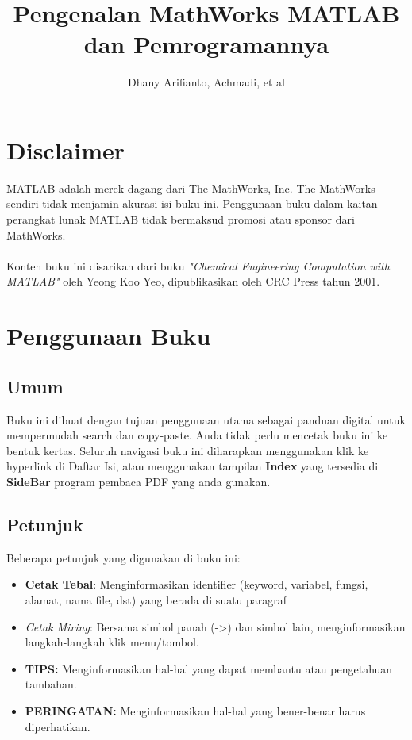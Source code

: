 \documentclass[12pt]{book}
\title{\LARGE \bf
	Pengenalan MathWorks MATLAB dan Pemrogramannya\\
}
\author{Dhany Arifianto, Achmadi, et al}
\date{}
\begin{document}
	\frontmatter
	\maketitle
	
	
	\newpage
	\tableofcontents
	
	
	\newpage
	\chapter{Disclaimer}
	
	MATLAB adalah merek dagang dari The MathWorks, Inc.
	The MathWorks sendiri tidak menjamin akurasi isi buku ini.
	Penggunaan buku dalam kaitan perangkat lunak MATLAB tidak bermaksud promosi atau sponsor dari MathWorks.
	\\
	\\
	Konten buku ini disarikan dari buku \textit{"Chemical Engineering Computation with MATLAB"} oleh Yeong Koo Yeo,
	dipublikasikan oleh CRC Press tahun 2001.
	
	
	\newpage
	\chapter{Penggunaan Buku}
	
	\section{Umum}
	Buku ini dibuat dengan tujuan penggunaan utama sebagai panduan digital untuk mempermudah search dan copy-paste.
	Anda tidak perlu mencetak buku ini ke bentuk kertas.
	Seluruh navigasi buku ini diharapkan menggunakan klik ke hyperlink di Daftar Isi,
	atau menggunakan tampilan \textbf{Index} yang tersedia di \textbf{SideBar} program pembaca PDF yang anda gunakan.
	
	\section{Petunjuk}
	Beberapa petunjuk yang digunakan di buku ini:
	\begin{itemize}
		\item \textbf{Cetak Tebal}: Menginformasikan identifier (keyword, variabel, fungsi, alamat, nama file, dst) yang berada di suatu paragraf
		\item \textit{Cetak Miring}: Bersama simbol panah (->) dan simbol lain, menginformasikan langkah-langkah klik menu/tombol.
		\item \textbf{TIPS:} Menginformasikan hal-hal yang dapat membantu atau pengetahuan tambahan.
		\item \textbf{PERINGATAN:} Menginformasikan hal-hal yang bener-benar harus diperhatikan.
	\end{itemize}
\end{document}
